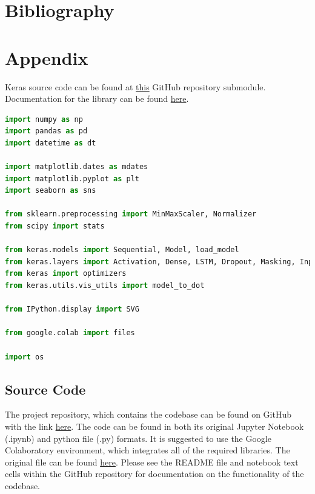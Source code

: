 \documentclass[10pt,onecolumn,letterpaper]{article}
\begin{document}
\newpage

\section{Bibliography}

{
\small


}

\newpage
 
\section{Appendix}

Keras source code can be found at \href{https://github.com/keras-team/keras/tree/master/keras}{this} GitHub repository submodule. Documentation for the library can be found \href{https://keras.io/}{here}.

\begin{lstlisting}[language=Python, breaklines=true, label={libraries}, caption={Depiction of the list of external packages used to develop the model. These packages are roughly split by use case; mathematical structuring, data visualisation, functionalities required, machine learning tools and miscellaneous.}]
import numpy as np
import pandas as pd
import datetime as dt

import matplotlib.dates as mdates
import matplotlib.pyplot as plt
import seaborn as sns

from sklearn.preprocessing import MinMaxScaler, Normalizer
from scipy import stats

from keras.models import Sequential, Model, load_model
from keras.layers import Activation, Dense, LSTM, Dropout, Masking, Input
from keras import optimizers
from keras.utils.vis_utils import model_to_dot

from IPython.display import SVG

from google.colab import files

import os
\end{lstlisting} 

\subsection{Source Code} \label{source code}

The project repository, which contains the codebase can be found on GitHub with the link \href{https://github.com/twutang/SXNP-Factor-Models}{here}. The code can be found in both its original Jupyter Notebook (.ipynb) and python file (.py) formats. It is suggested to use the Google Colaboratory environment, which integrates all of the required libraries. The original file can be found \href{https://colab.research.google.com/drive/1IHPEI-sPNSS0rKdFThywR4LTpeOt0Z_y}{here}. Please see the README file and notebook text cells within the GitHub repository for documentation on the functionality of the codebase. 
\end{document}
